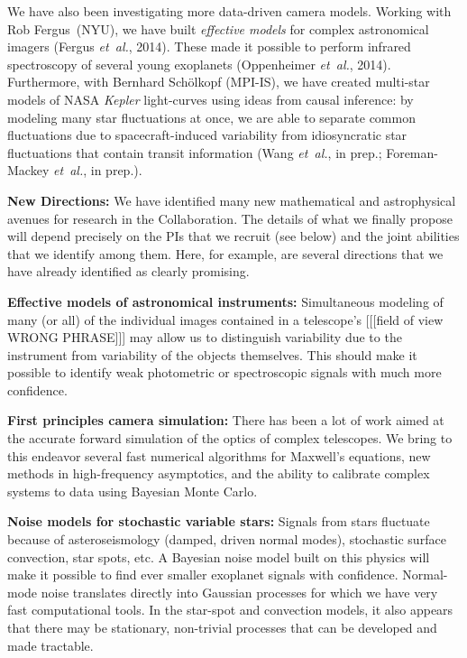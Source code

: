 \documentclass[11pt]{article}
\newcommand{\foreign}[1]{\textsl{#1}}
\newcommand{\etal}{\foreign{et~al.}}
\newcommand{\project}[1]{\textsl{#1}}
\renewcommand{\paragraph}[1]{\smallskip\par\noindent\textbf{{#1}:}}
\begin{document}
We have also been investigating more data-driven camera models.
Working with Rob Fergus~(NYU), we have built
{\em effective models} for complex astronomical 
imagers (Fergus \etal, 2014).
These made it possible to perform infrared spectroscopy of several 
young exoplanets (Oppenheimer \etal, 2014).
Furthermore, with Bernhard Sch\"olkopf (MPI-IS), we have created
multi-star models of NASA \project{Kepler} light-curves using ideas from
causal inference:
by modeling many star fluctuations at once, we are able to separate
common fluctuations due to spacecraft-induced variability from idiosyncratic
star fluctuations that contain transit information (Wang \etal, in prep.;
Foreman-Mackey \etal, in prep.).

\paragraph{New Directions}
We have identified many new mathematical and astrophysical avenues for
research in the Collaboration.
The details of what we finally propose will depend precisely on the
PIs that we recruit (see below) and the joint abilities that we
identify among them.
Here, for example, are several directions that we have already
identified as clearly promising.

\textbf{Effective models of astronomical instruments:}
Simultaneous modeling of many (or all) of the individual images contained in
a telescope's [[[field of view WRONG PHRASE]]] 
may allow us to distinguish variability due to the instrument from
variability of the objects themselves.  
This should make it possible to identify weak photometric or spectroscopic
signals with much more confidence.

\textbf{First principles camera simulation:} 
There has been a lot of work aimed at the accurate forward simulation of the
optics of complex telescopes.
We bring to this endeavor several fast numerical algorithms for 
Maxwell's equations, new methods in 
high-frequency asymptotics, and the ability to calibrate complex systems 
to data using Bayesian Monte Carlo.

\textbf{Noise models for stochastic variable stars:}
Signals from stars fluctuate because of asteroseismology 
(damped, driven normal modes), stochastic surface convection, star
spots, etc.
A Bayesian noise model built on this physics will make it possible to 
find ever smaller exoplanet signals with confidence.
Normal-mode noise translates directly into Gaussian processes 
for which we have very fast computational tools.
In the star-spot and convection models, it also appears that there may
be stationary, non-trivial processes that can be developed and made
tractable.
\end{document}
